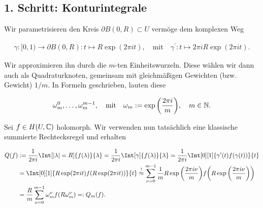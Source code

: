 \subsection*{1. Schritt: Konturintegrale}

%

Wir parametrisieren den Kreis $\partial B(0, R) \subset U$ vermöge dem komplexen Weg

\begin{align*}
    \gamma: [0, 1) \to \partial B(0, R): t \mapsto R \exp(2 \pi i t),
    \quad
    \text{mit}
    \quad
    \gamma^\prime: t \mapsto 2 \pi i R \exp(2 \pi i t).
\end{align*}

Wir approximieren ihn durch die $m$-ten Einheitswurzeln.
Diese wählen wir dann auch als Quadraturknoten, gemeinsam mit gleichmäßigen Gewichten (bzw. Gewicht) $1 / m$.
In Formeln geschrieben, lauten diese

\begin{align*}
    \omega_m^0, \dots, \omega_m^{m - 1},
    \quad
    \text{mit}
    \quad
    \omega_m := \exp {\left ( \frac{2 \pi i}{m} \right )},
    \quad
    m \in \mathbb{N}.
\end{align*}

Sei $f \in H(U, \mathbb{C})$ holomorph.
Wir verwenden nun tatsächlich eine klassische summierte Rechtecksregel und erhalten

\begin{align*}
    Q(f)
    & :=
    \frac{1}{2 \pi i}
    \Int[|\lambda| = R]
    {
        f(\lambda)
    }{\lambda}
    =
    \frac{1}{2 \pi i}
    \Int[\gamma]
    {
        f(\lambda)
    }{\lambda}
    =
    \frac{1}{2 \pi i}
    \Int[0][1]
    {
        \gamma^\prime(t)
        f(\gamma(t))
    }{t} \\
    & =
    \Int[0][1]
    {
        R
        \exp(2 \pi i t)
        f(R \exp(2 \pi i t))
    }{t}
    \stackrel{!}{\approx}
    \sum_{\nu = 0}^{m-1}
        \frac{1}{m}
        R \exp \pbraces{\frac{2 \pi i \nu}{m}}
        f
        \pbraces
        {
            R \exp \pbraces{\frac{2 \pi i \nu}{m}}
        } \\
    & =
    \frac{R}{m}
    \sum_{\nu = 0}^{m-1}
        \omega_m^\nu
        f(R \omega_m^\nu)
    =:
    Q_m(f).
\end{align*}

